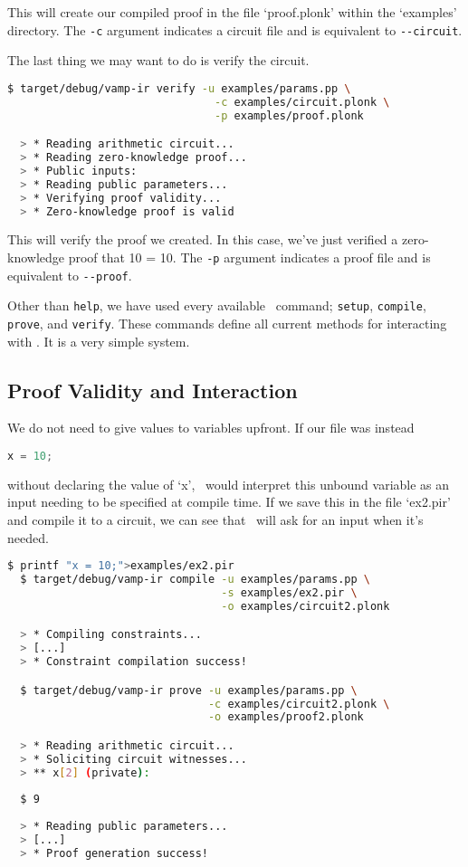 This will create our compiled proof in the file `proof.plonk' within the `examples' directory. The \lstinline{-c} argument indicates a circuit file and is equivalent to \lstinline{--circuit}.

The last thing we may want to do is verify the circuit.

\begin{lstlisting}[language=bash]
  $ target/debug/vamp-ir verify -u examples/params.pp \
                                -c examples/circuit.plonk \
                                -p examples/proof.plonk

  > * Reading arithmetic circuit...
  > * Reading zero-knowledge proof...
  > * Public inputs:
  > * Reading public parameters...
  > * Verifying proof validity...
  > * Zero-knowledge proof is valid
\end{lstlisting}

This will verify the proof we created. In this case, we've just verified a zero-knowledge proof that 10 = 10. The \lstinline{-p} argument indicates a proof file and is equivalent to \lstinline{--proof}. 

Other than \lstinline{help}, we have used every available \vampir\ command; \lstinline{setup}, \lstinline{compile}, \lstinline{prove}, and \lstinline{verify}. These commands define all current methods for interacting with \vampir. It is a very simple system.

\subsection{Proof Validity and Interaction}

We do not need to give values to variables upfront. If our file was instead 

\begin{lstlisting}[language=Python, caption={}]
  x = 10;
\end{lstlisting}

without declaring the value of `x', \vampir\ would interpret this unbound variable as an input needing to be specified at compile time. If we save this in the file `ex2.pir' and compile it to a circuit, we can see that \vampir\ will ask for an input when it's needed.


\begin{lstlisting}[language=bash]
  $ printf "x = 10;">examples/ex2.pir
  $ target/debug/vamp-ir compile -u examples/params.pp \
                                 -s examples/ex2.pir \
                                 -o examples/circuit2.plonk

  > * Compiling constraints...
  > [...]
  > * Constraint compilation success!

  $ target/debug/vamp-ir prove -u examples/params.pp \
                               -c examples/circuit2.plonk \
                               -o examples/proof2.plonk

  > * Reading arithmetic circuit...
  > * Soliciting circuit witnesses...
  > ** x[2] (private): 
  
  $ 9
  
  > * Reading public parameters...
  > [...]
  > * Proof generation success!
\end{lstlisting}

